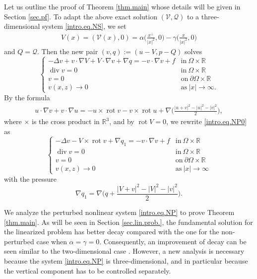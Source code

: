 \documentclass[11pt,a4paper]{article}
\numberwithin{equation}{section}
\newcommand{\R}{\mathbb{R}}
\newcommand{\opdiv}{\operatorname{div}}
\newcommand{\oprot}{\operatorname{rot}}
\begin{document}
Let us outline the proof of Theorem \ref{thm.main} whose details will be given in Section \ref{sec.pf}. To adapt the above exact solution $({\mathcal V}, {\mathcal Q})$ to a three-dimensional system \eqref{intro.eq.NS}, we set
%
\begin{align}\label{def.V}
V(x) 
= ({\mathcal V}(x),0)
= \alpha \Big(\frac{x^{\bot}}{|x|^2},0\Big)
- \gamma \Big(\frac{x}{|x|^2}, 0\Big)
\end{align}
%
and $Q={\mathcal Q}$. Then the new pair $(v,q):=(u-V, p-Q)$ solves 
%
\begin{equation}\label{intro.eq.NP0}
\left\{
\begin{array}{ll}
-\Delta v 
+ v\cdot\nabla V 
+ V\cdot\nabla v 
+ \nabla q 
= 
- v\cdot\nabla v
+ f&\mbox{in}\ \Omega\times\R \\
\opdiv  v = 0&\mbox{in}\ \Omega\times\R \\
v= 0 &\mbox{on}\ \partial\Omega\times\R \\
v(x,z)\to0&\mbox{as}\ |x|\to\infty. 
\end{array}\right.
\end{equation}
%
By the formula 
%
\begin{align}\label{intro.eq.bilinear.rot}
u\cdot\nabla v + v\cdot\nabla u 
= -u\times\oprot v - v\times\oprot u 
+ \nabla\Big(
\frac{|u+v|^2-|u|^2-|v|^2}2
\Big), 
\end{align}
%
where $\times$ is the cross product in $\R^3$, and by $\oprot V=0$, we rewrite \eqref{intro.eq.NP0} as 
%
\begin{equation}\tag{NP}\label{intro.eq.NP}
\left\{
\begin{array}{ll}
-\Delta v -V\times\oprot v + \nabla q_1 
= 
- v\cdot\nabla v 
+ f&\mbox{in}\ \Omega\times\R \\
\opdiv   v = 0&\mbox{in}\ \Omega\times\R \\
v= 0 &\mbox{on}\ \partial\Omega\times\R \\
v(x,z)\to0&\mbox{as}\ |x|\to\infty 
\end{array}\right.
\end{equation}
%
with the pressure
\[
\nabla q_1 
= \nabla 
\Big(
q + \frac{|V+v|^2-|V|^2-|v|^2}2
\Big). 
\]


We analyze the perturbed nonlinear system \eqref{intro.eq.NP} to prove Theorem \ref{thm.main}. As will be seen in Section \ref{sec.lin.prob.}, the fundamental solution for the linearized problem has better decay compared with the one for the non-perturbed case when $\alpha=\gamma=0$. Consequently, an improvement of decay can be seen similar to the two-dimensional case \cite{HW2013, Higaki2023, MT2023}. However, a new analysis is necessary because the system \eqref{intro.eq.NP} is three-dimensional, and in particular because the vertical component has to be controlled separately. 
\end{document}
